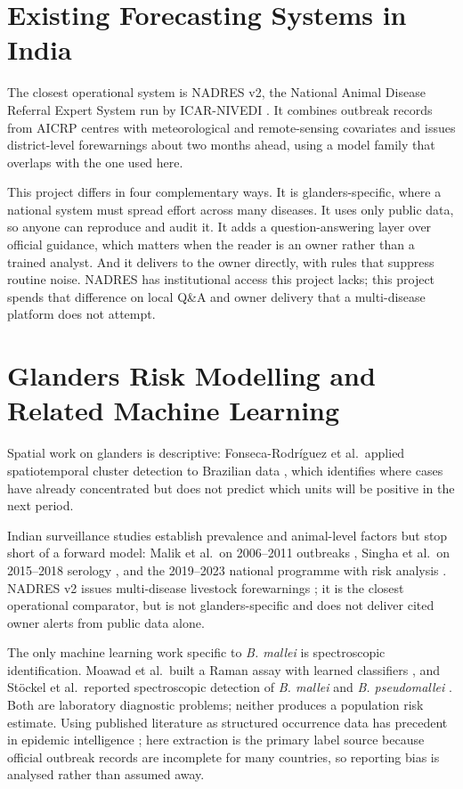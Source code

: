 \documentclass[10pt,openany]{report}
\begin{document}
\section{Existing Forecasting Systems in India}

The closest operational system is NADRES v2, the National Animal Disease Referral Expert System run
by ICAR-NIVEDI \cite{nadres}. It combines outbreak records from AICRP centres with meteorological and
remote-sensing covariates and issues district-level forewarnings about two months ahead, using a
model family that overlaps with the one used here.

This project differs in four complementary ways. It is glanders-specific, where a national system
must spread effort across many diseases. It uses only public data, so anyone can reproduce and audit
it. It adds a question-answering layer over official guidance, which matters when the reader is an
owner rather than a trained analyst. And it delivers to the owner directly, with rules that suppress
routine noise. NADRES has institutional access this project lacks; this project spends that
difference on local Q\&A and owner delivery that a multi-disease platform does not attempt.

\section{Glanders Risk Modelling and Related Machine Learning}

Spatial work on glanders is descriptive: Fonseca-Rodr\'iguez et al.\ applied spatiotemporal cluster
detection to Brazilian data \cite{fonseca2019}, which identifies where cases have already
concentrated but does not predict which units will be positive in the next period.

Indian surveillance studies establish prevalence and animal-level factors but stop short of a forward
model: Malik et al.\ on 2006--2011 outbreaks \cite{malik2012}, Singha et al.\ on 2015--2018
serology \cite{singha2020}, and the 2019--2023 national programme with risk analysis
\cite{singha2026}. NADRES v2 issues multi-disease livestock forewarnings \cite{nadres}; it is the
closest operational comparator, but is not glanders-specific and does not deliver cited owner alerts
from public data alone.

The only machine learning work specific to \textit{B. mallei} is spectroscopic identification.
Moawad et al.\ built a Raman assay with learned classifiers \cite{moawad2019}, and St\"ockel et al.\
reported spectroscopic detection of \textit{B. mallei} and \textit{B. pseudomallei}
\cite{stoeckel2015}. Both are laboratory diagnostic problems; neither produces a population risk
estimate. Using published literature as structured occurrence data has precedent in epidemic
intelligence \cite{collier2012,lejeune2015}; here extraction is the primary label source because
official outbreak records are incomplete for many countries, so reporting bias is analysed rather
than assumed away.
\end{document}
